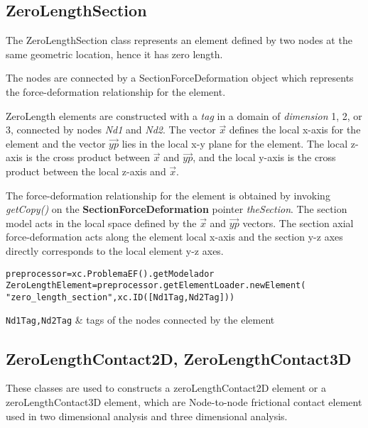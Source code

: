 \subsection{ZeroLengthSection}
The ZeroLengthSection class represents an element defined by two nodes at the same geometric location, hence it has zero length.

The nodes are connected by a SectionForceDeformation object which represents the force-deformation relationship for the element. 

ZeroLength elements are constructed with a {\em tag} in a domain of {\em dimension} 1, 2, or 3, connected by nodes {\em Nd1} and {\em Nd2}. 
The vector $\vec{x}$ defines the local x-axis for the element and the vector $\vec{yp}$ lies in the local x-y plane for the element.  The local z-axis is the cross product between $\vec{x}$ and $\vec{yp}$, and the local y-axis is the cross product between the local z-axis and $\vec{x}$.

The force-deformation relationship for the element is obtained by invoking {\em getCopy()} on the {\bf SectionForceDeformation} pointer {\em theSection}. The section model acts in the local space defined by the $\vec{x}$ and $\vec{yp}$ vectors. The section axial force-deformation acts along the element local x-axis and the section y-z axes directly corresponds to the local element y-z axes.

\begin{verbatim}
preprocessor=xc.ProblemaEF().getModelador
ZeroLengthElement=preprocessor.getElementLoader.newElement(
"zero_length_section",xc.ID([Nd1Tag,Nd2Tag]))
\end{verbatim}
\begin{paramFuncTable}
{\tt Nd1Tag,Nd2Tag} & tags of the nodes connected by the element\\
\end{paramFuncTable}

\begin{paramClassTable}
\ElementParam{}
\ElementZERODParam{}
\end{paramClassTable}

\begin{methodsTable}
\ElementMeth{}
\ElementZERODMeth{}
\ZeroLengthSectionMeth{}
\end{methodsTable}


\subsection{ZeroLengthContact2D, ZeroLengthContact3D}
These classes are used to constructs a zeroLengthContact2D element or a zeroLengthContact3D element, which are Node-to-node frictional contact element used in two dimensional analysis and three dimensional analysis.

